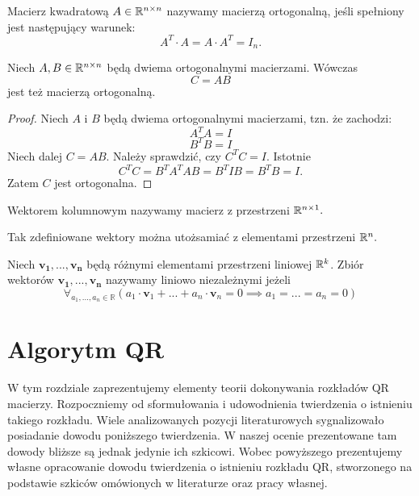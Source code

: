 \documentclass[12pt,a4paper]{report}
\newcommand{\vr}[1]{\mathbf{#1}}
\newcommand{\mx}[1]{{#1}}
\begin{document}
\begin{definition}
Macierz kwadratową $\mx{A}\in \setR^{n\times n}$ nazywamy macierzą ortogonalną, jeśli spełniony jest następujący warunek:
$$
\mx{A}^{T}\cdot \mx{A}=\mx{A}\cdot \mx{A}^{T}=\mx{I}_{n}.
$$
\end{definition}

\begin{lemma}
Niech $\mx{A},\mx{B} \in \setR^{n \times n }$ będą dwiema ortogonalnymi macierzami. Wówczas 
$$
\mx{C}=\mx{A}\mx{B}
$$
jest też macierzą ortogonalną. 
\end{lemma}

\begin{proof}
Niech $\mx{A}$ i $\mx{B}$ będą dwiema ortogonalnymi macierzami, tzn. że zachodzi:
$$
\mx{A}^{T}\mx{A} = \mx{I}
$$
$$
\mx{B}^{T}\mx{B} = \mx{I}
$$
Niech dalej $\mx{C}=\mx{A}\mx{B}$. Należy sprawdzić, czy $\mx{C}^{T}\mx{C}=\mx{I}$. Istotnie
$$
\mx{C}^{T}\mx{C} = \mx{B}^{T}\mx{A}^{T}\mx{A}\mx{B} = \mx{B}^{T}\mx{I}\mx{B} = \mx{B}^{T}\mx{B} = \mx{I}.
$$
Zatem $\mx{C}$ jest ortogonalna.
\end{proof}

\begin{definition}
Wektorem kolumnowym nazywamy macierz z przestrzeni $\mathbb{R}^{n\times 1}.$
\end{definition}

Tak zdefiniowane wektory można utożsamiać z elementami przestrzeni $\mathbb{R}^{n}.$

\begin{definition}
Niech $\vr{v_{1}},..., \vr{v_{n}}$ będą różnymi elementami przestrzeni liniowej $\mathbb{R}^{k}$. Zbiór wektorów ${\vr{v_{1}},...,\vr{v_{n}}}$ nazywamy liniowo niezależnymi jeżeli 
$$
\forall_{a_{1},...,a_{n}\in \mathbb{R}} (a_{1}\cdot \vr{v}_{1} + ... + a_{n}\cdot \vr{v}_{n} = 0 \implies a_{1}=...=a_{n}=0)
$$ 
\end{definition}


\chapter{Algorytm QR}

W tym rozdziale zaprezentujemy elementy teorii dokonywania rozkładów QR macierzy. Rozpoczniemy od sformułowania i udowodnienia twierdzenia o istnieniu takiego rozkładu. Wiele analizowanych pozycji literaturowych sygnalizowało posiadanie dowodu poniższego twierdzenia. W naszej ocenie prezentowane tam dowody bliższe są jednak jedynie ich szkicowi. Wobec powyższego prezentujemy własne opracowanie dowodu twierdzenia o istnieniu rozkładu QR, stworzonego na podstawie szkiców omówionych w literaturze oraz pracy własnej. 
\end{document}
